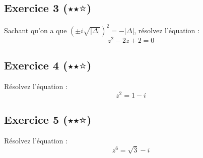 \documentclass{article}
\begin{document}
\subsection*{Exercice 3 ($\medblackstar \medblackstar \medwhitestar$)}

Sachant qu'on a que $(\pm i \sqrt{|\Delta|})^2 = -|\Delta|$, résolvez l'équation : 
\begin{equation*}
    z^2 -2z+2 = 0
\end{equation*}

\subsection*{Exercice 4 ($\medblackstar \medblackstar \medwhitestar$)}

Résolvez l'équation : $$z^2 = 1-i$$

\subsection*{Exercice 5 ($\medblackstar \medblackstar \medwhitestar$)}

Résolvez l'équation : $$z^6 = \sqrt{3} - i$$
\end{document}
